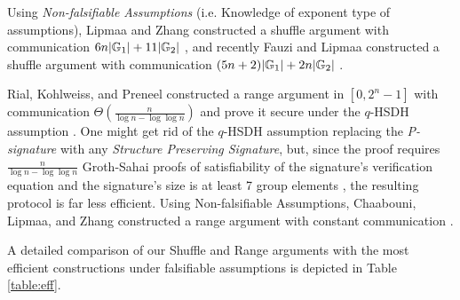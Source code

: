 Using \emph{Non-falsifiable Assumptions} (i.e. Knowledge of exponent type of assumptions), Lipmaa and Zhang constructed a shuffle argument with communication $6n|\mathbb{G}_1|+11|\mathbb{G}_2|$ \cite{SCN:LipZha12}, and recently Fauzi and Lipmaa constructed a shuffle argument with communication $(5n+2)|\mathbb{G}_1|+2n|\mathbb{G}_2|$ \cite{EPRINT:FauLip15}.

Rial, Kohlweiss, and Preneel constructed a range argument in $[0,2^n-1]$ with communication $\Theta(\frac{n}{\log n -\log\log n})$ and prove it secure under the $q$-HSDH assumption \cite{PAIRING:RiaKohPre09}. One might get rid of the $q$-HSDH assumption replacing the \emph{P-signature} with any \emph{Structure Preserving Signature}, but, since the proof requires $\frac{n}{\log n-\log \log n}$ Groth-Sahai proofs of satisfiability of the signature's verification equation and the signature's size is at least 7 group elements \cite{C:KilPanWee15}, the resulting protocol is far less efficient.
Using Non-falsifiable Assumptions, Chaabouni, Lipmaa, and Zhang constructed a range argument with constant communication \cite{FC:ChaLipZha12}. 

A detailed comparison of our Shuffle and Range arguments with the most efficient constructions under falsifiable assumptions is depicted in Table \ref{table:eff}.




